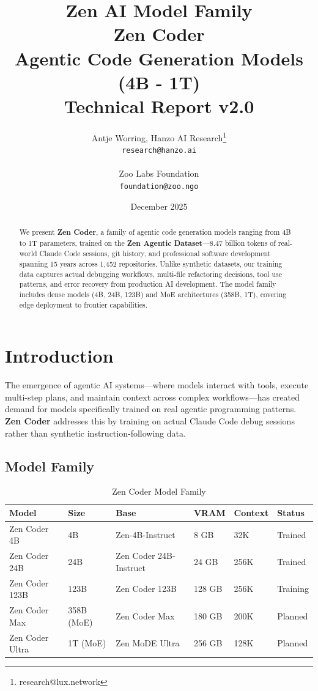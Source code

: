 \documentclass[11pt,a4paper]{article}
\title{
    \vspace{-2cm}
    \Large \textbf{Zen AI Model Family} \\
    \vspace{0.5cm}
    \Huge \textbf{Zen Coder} \\
    \vspace{0.3cm}
    \large Agentic Code Generation Models (4B - 1T) \\
    \vspace{0.5cm}
    \normalsize Technical Report v2.0
}
\author{
    Antje Worring, Hanzo AI Research\thanks{research@lux.network} \\
    \texttt{research@hanzo.ai} \\
    \\
    Zoo Labs Foundation \\
    \texttt{foundation@zoo.ngo}
}
\date{December 2025}
\begin{document}
\maketitle

\begin{abstract}
We present \textbf{Zen Coder}, a family of agentic code generation models ranging from 4B to 1T parameters,
trained on the \textbf{Zen Agentic Dataset}---8.47 billion tokens of real-world Claude Code sessions,
git history, and professional software development spanning 15 years across 1,452 repositories.
Unlike synthetic datasets, our training data captures actual debugging workflows, multi-file refactoring decisions,
tool use patterns, and error recovery from production AI development. The model family includes dense models
(4B, 24B, 123B) and MoE architectures (358B, 1T), covering edge deployment to frontier capabilities.
\end{abstract}

\tableofcontents
\newpage

\section{Introduction}

The emergence of agentic AI systems---where models interact with tools, execute multi-step plans, and
maintain context across complex workflows---has created demand for models specifically trained on
real agentic programming patterns. \textbf{Zen Coder} addresses this by training on actual Claude Code
debug sessions rather than synthetic instruction-following data.

\subsection{Model Family}

\begin{table}[H]
\centering
\begin{tabular}{llllll}
\toprule
\textbf{Model} & \textbf{Size} & \textbf{Base} & \textbf{VRAM} & \textbf{Context} & \textbf{Status} \\
\midrule
Zen Coder 4B & 4B & Zen-4B-Instruct & 8 GB & 32K & Trained \\
Zen Coder 24B & 24B & Zen Coder 24B-Instruct & 24 GB & 256K & Trained \\
Zen Coder 123B & 123B & Zen Coder 123B & 128 GB & 256K & Training \\
Zen Coder Max & 358B (MoE) & Zen Coder Max & 180 GB & 200K & Planned \\
Zen Coder Ultra & 1T (MoE) & Zen MoDE Ultra & 256 GB & 128K & Planned \\
\bottomrule
\end{tabular}
\caption{Zen Coder Model Family}
\end{table}
\end{document}
